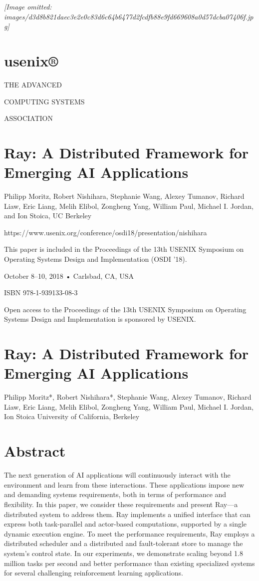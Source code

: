 \documentclass[
]{article}
\author{}
\date{}
\begin{document}
\textit{[Image omitted: images/d3d8b821daec3e2e0c83d6c64b6477d2fcdfb88e9fd669608a0d57dcba07406f.jpg]}

\section{usenix®}\label{usenix}

THE ADVANCED

COMPUTING SYSTEMS

ASSOCIATION

\section{Ray: A Distributed Framework for Emerging AI
Applications}\label{ray-a-distributed-framework-for-emerging-ai-applications}

Philipp Moritz, Robert Nishihara, Stephanie Wang, Alexey Tumanov,
Richard Liaw, Eric Liang, Melih Elibol, Zongheng Yang, William Paul,
Michael I. Jordan, and Ion Stoica, UC Berkeley

https://www.usenix.org/conference/osdi18/presentation/nishihara

This paper is included in the Proceedings of the 13th USENIX Symposium
on Operating Systems Design and Implementation (OSDI '18).

October 8--10, 2018 • Carlsbad, CA, USA

ISBN 978-1-939133-08-3

Open access to the Proceedings of the 13th USENIX Symposium on Operating
Systems Design and Implementation is sponsored by USENIX.

\section{Ray: A Distributed Framework for Emerging AI
Applications}\label{ray-a-distributed-framework-for-emerging-ai-applications-1}

Philipp Moritz*, Robert Nishihara*, Stephanie Wang, Alexey Tumanov,
Richard Liaw, Eric Liang, Melih Elibol, Zongheng Yang, William Paul,
Michael I. Jordan, Ion Stoica University of California, Berkeley

\section{Abstract}\label{abstract}

The next generation of AI applications will continuously interact with
the environment and learn from these interactions. These applications
impose new and demanding systems requirements, both in terms of
performance and flexibility. In this paper, we consider these
requirements and present Ray---a distributed system to address them. Ray
implements a unified interface that can express both task-parallel and
actor-based computations, supported by a single dynamic execution
engine. To meet the performance requirements, Ray employs a distributed
scheduler and a distributed and fault-tolerant store to manage the
system's control state. In our experiments, we demonstrate scaling
beyond 1.8 million tasks per second and better performance than existing
specialized systems for several challenging reinforcement learning
applications.
\end{document}
